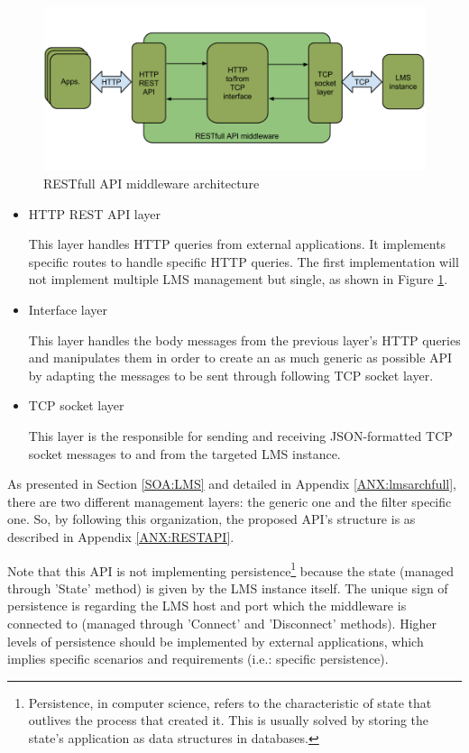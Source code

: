 \begin{figure}[!htb]
\begin{center}
\includegraphics[width=1\textwidth]{./images/RESTAPI.png}
\caption{RESTfull API middleware architecture}
\label{F:restAPI}
\end{center}
\end{figure}

\begin{itemize}
\item HTTP REST API layer \hfill

This layer handles HTTP queries from external applications. It implements specific routes to handle specific HTTP queries. The first implementation will not implement multiple LMS management but single, as shown in Figure \ref{F:restAPI}.

\item Interface layer \hfill

This layer handles the body messages from the previous layer's HTTP queries and manipulates them in order to create an as much generic as possible API by adapting the messages to be sent through following TCP socket layer.

\item TCP socket layer \hfill

This layer is the responsible for sending and receiving JSON-formatted TCP socket messages to and from the targeted LMS instance.
\end{itemize}

As presented in Section \ref{SOA:LMS} and detailed in Appendix \ref{ANX:lmsarchfull}, there are two different management layers: the generic one and the filter specific one. So, by following this organization, the proposed API's structure is as described in Appendix \ref{ANX:RESTAPI}.

Note that this API is not implementing persistence\footnote{Persistence, in computer science, refers to the characteristic of state that outlives the process that created it. This is usually solved by storing the state's application as data structures in databases.} because the state (managed through 'State' method) is given by the LMS instance itself. The unique sign of persistence is regarding the LMS host and port which the middleware is connected to (managed through 'Connect' and 'Disconnect' methods). Higher levels of persistence should be implemented by external applications, which implies specific scenarios and requirements (i.e.: specific persistence).

